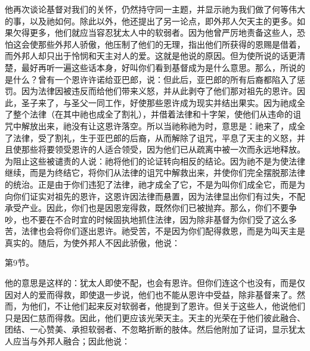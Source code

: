 \par

\par

他再次谈论基督对我们的关怀，仍然持守同一主题，并显示祂为我们做了何等伟大的事，以及祂如何。除此以外，他还提出了另一论点，即外邦人欠天主的更多。如果欠得更多，他们就应当容忍犹太人中的软弱者。因为他曾严厉地责备这些人，恐怕这会使那些外邦人骄傲，他压制了他们的无理，指出他们所获得的恩赐是借着，而外邦人却只出于怜悯和天主对人的爱。这就是他说的原因。但为使所说的话更清楚，最好再听一遍这些话本身，好叫你们看到基督成为是什么意思。那么，所说的是什么？曾有一个恩许许诺给亚巴郎，说：但此后，亚巴郎的所有后裔都陷入了惩罚。因为法律因被违反而给他们带来义怒，并从此剥夺了他们那对祖先的恩许。因此，圣子来了，与圣父一同工作，好使那些恩许成为现实并结出果实。因为祂成全了整个法律（在其中祂也成全了割礼），并借着法律和十字架，使他们从违命的诅咒中解放出来，祂没有让这恩许落空。所以当祂称祂为时，意思是：祂来了，成全了法律，受了割礼，生于亚巴郎的后裔，从而解除了诅咒，平息了天主的义怒，并且使那些将要领受恩许的人适合领受，因为他们已从疏离中被一次而永远地释放。为阻止这些被谴责的人说：祂将他们的论证转向相反的结论。因为祂不是为使法律继续，而是为终结它，将你们从法律的诅咒中解救出来，并使你们完全摆脱那法律的统治。正是由于你们违犯了法律，祂才成全了它，不是为叫你们成全它，而是为向你们证实对祖先的恩许，这恩许因法律而悬置，因为法律显出你们有过失，不配承受产业。因此，你们也是因恩宠得救，既然你们已被抛弃。那么，你们不要争吵，也不要在不合时宜的时候固执地抓住法律，因为除非基督为你们受了这么多苦，法律也会将你们逐出恩许。祂受苦，不是因为你们配得救恩，而是为叫天主是真实的。随后，为使外邦人不因此骄傲，他说：\par

第9节。\par

他的意思是这样的：犹太人即使不配，也会有恩许。但你们连这个也没有，而是仅因对人的爱而得救，即使退一步说，他们也不能从恩许中受益，除非基督来了。然而，为他们，不让他们起来反对软弱者，他提到了恩许。但关于这些人，他说他们只是因仁慈而得救。因此，他们更应该光荣天主。天主的光荣在于他们彼此融合、团结、一心赞美、承担软弱者、不忽略折断的肢体。然后他附加了证词，显示犹太人应当与外邦人融合；因此他说：\par

